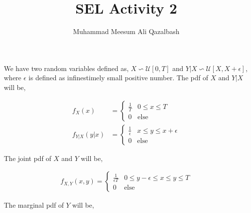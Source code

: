 \documentclass{article}
\title{SEL Activity 2}
\author{Muhammad Meesum Ali Qazalbash}
\theoremstyle{mytheoremstyle}
\theoremstyle{mytheoremstyle}
\theoremstyle{myproblemstyle}
\begin{document}
\maketitle

We have two random variables defined as, \(X\backsim\mathcal{U}[0,T]\) and \(Y|X\backsim \mathcal{U}[X,X+\epsilon]\), where \(\epsilon\) is defined as infinestimely small positive number. The pdf of \(X\) and \(Y|X\) will be,

\begin{equation*}
	\begin{split}
		f_X(x)&=\begin{cases}
			\displaystyle\frac{1}{T} & 0\le x\le T \\
			0                        & \text{else}
		\end{cases}\\
		f_{Y|X}(y|x)&=\begin{cases}
			\displaystyle\frac{1}{\epsilon} & x\le y\le x+\epsilon \\
			0                               & \text{else}
		\end{cases}
	\end{split}
\end{equation*}

The joint pdf of \(X\) and \(Y\) will be,

\begin{equation*}
	\begin{split}
		f_{X,Y}(x,y)=\begin{cases}
			\displaystyle\frac{1}{\epsilon T} & 0\le y-\epsilon\le x\le y\le T \\
			0                                 & \text{else}
		\end{cases}
	\end{split}
\end{equation*}

The marginal pdf of \(Y\) will be,
\end{document}
